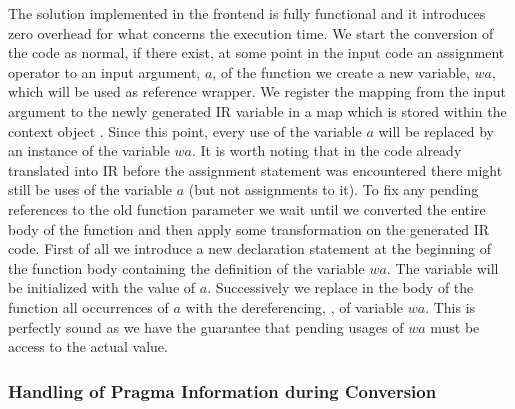 The solution implemented in the frontend is fully functional and it introduces
zero overhead for what concerns the execution time. We start the conversion of
the code as normal, if there exist, at some point in the input code an
assignment operator to an input argument, $a$, of the function we create a new
variable, $wa$, which will be used as reference wrapper. We register the mapping
from the input argument to the newly generated IR variable in a map which is
stored within the context object . Since this point, every use
of the variable $a$ will be replaced by an instance of the variable $wa$. It is
worth noting that in the code already translated into IR before the assignment
statement was encountered there might still be uses of the variable $a$ (but not
assignments to it). To fix any pending references to the old function parameter
we wait until we converted the entire body of the function and then apply some
transformation on the generated IR code. First of all we introduce a new
declaration statement at the beginning of the function body containing the
definition of the variable $wa$. The variable will be initialized with the value
of $a$. Successively we replace in the body of the function all occurrences of
$a$ with the dereferencing, , of variable $wa$. This is
perfectly sound as we have the guarantee that pending usages of $wa$ must be
access to the actual value.

\subsubsection{Handling of Pragma Information during Conversion}

